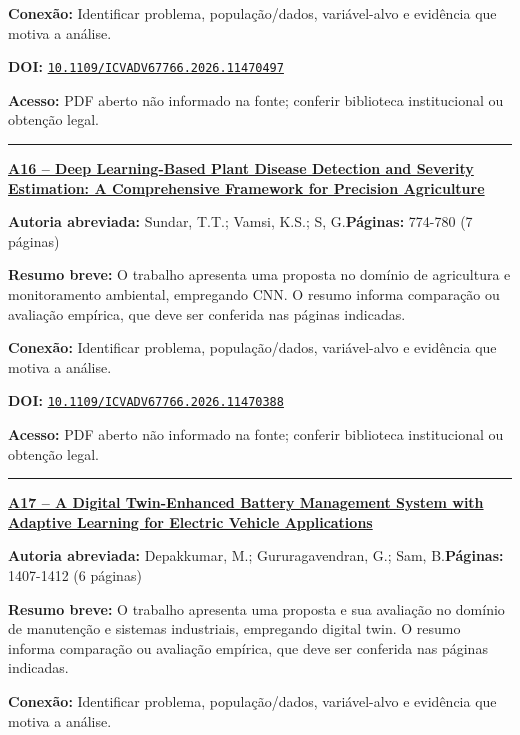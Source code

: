 \documentclass[10pt,a4paper]{article}
\begin{document}
\textbf{Conexão:} Identificar problema, população/dados, variável-alvo e evidência que motiva a análise.\par
\textbf{DOI:} \href{https://doi.org/10.1109/ICVADV67766.2026.11470497}{\nolinkurl{10.1109/ICVADV67766.2026.11470497}}\par
\textbf{Acesso:} PDF aberto não informado na fonte; conferir biblioteca institucional ou obtenção legal.\par
\noindent\rule{\textwidth}{0.35pt}
\par\medskip\noindent
{\large\bfseries\href{https://doi.org/10.1109/ICVADV67766.2026.11470388}{A16 -- Deep Learning-Based Plant Disease Detection and Severity Estimation: A Comprehensive Framework for Precision Agriculture}}\par\smallskip
\textbf{Autoria abreviada:} Sundar, T.T.; Vamsi, K.S.; S, G.\quad \textbf{Páginas:} 774-780 (7 páginas)\par
\textbf{Resumo breve:} O trabalho apresenta uma proposta no domínio de agricultura e monitoramento ambiental, empregando CNN. O resumo informa comparação ou avaliação empírica, que deve ser conferida nas páginas indicadas.\par
\textbf{Conexão:} Identificar problema, população/dados, variável-alvo e evidência que motiva a análise.\par
\textbf{DOI:} \href{https://doi.org/10.1109/ICVADV67766.2026.11470388}{\nolinkurl{10.1109/ICVADV67766.2026.11470388}}\par
\textbf{Acesso:} PDF aberto não informado na fonte; conferir biblioteca institucional ou obtenção legal.\par
\noindent\rule{\textwidth}{0.35pt}
\par\medskip\noindent
{\large\bfseries\href{https://doi.org/10.1109/ICVADV67766.2026.11469787}{A17 -- A Digital Twin-Enhanced Battery Management System with Adaptive Learning for Electric Vehicle Applications}}\par\smallskip
\textbf{Autoria abreviada:} Depakkumar, M.; Gururagavendran, G.; Sam, B.\quad \textbf{Páginas:} 1407-1412 (6 páginas)\par
\textbf{Resumo breve:} O trabalho apresenta uma proposta e sua avaliação no domínio de manutenção e sistemas industriais, empregando digital twin. O resumo informa comparação ou avaliação empírica, que deve ser conferida nas páginas indicadas.\par
\textbf{Conexão:} Identificar problema, população/dados, variável-alvo e evidência que motiva a análise.\par
\end{document}
